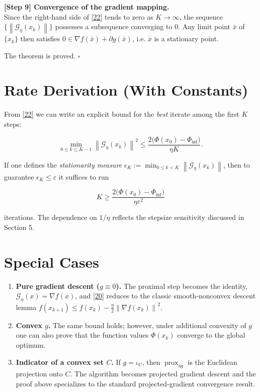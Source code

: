 \documentclass{article}
\newcommand{\prox}{\operatorname{prox}}
\newcommand{\grad}{\nabla}
\newcommand{\norm}[1]{\left\|#1\right\|}
\begin{document}
\noindent\textbf{[Step 9] Convergence of the gradient mapping.}\\
Since the right‑hand side of \eqref{22} tends to zero as $K\to\infty$, the sequence $\{\norm{\mathcal{G}_{\eta}(x_k)}\}$ possesses a subsequence converging to $0$. Any limit point $\bar x$ of $\{x_k\}$ then satisfies $0\in\grad f(\bar x)+\partial g(\bar x)$, i.e. $\bar x$ is a stationary point.

The theorem is proved. $\square$

\section*{Rate Derivation (With Constants)}
From \eqref{22} we can write an explicit bound for the \emph{best} iterate among the first $K$ steps:

\[
\min_{0\le k\le K-1}\norm{\mathcal{G}_{\eta}(x_k)}^{2}
\le \frac{2\bigl(\Phi(x_{0})-\Phi_{\inf}\bigr)}{\eta K}.
\]

If one defines the \emph{stationarity measure} $\epsilon_K:=\min_{0\le k<K}\norm{\mathcal{G}_{\eta}(x_k)}$, then to guarantee $\epsilon_K\le\varepsilon$ it suffices to run  

\[
K\ge \frac{2\bigl(\Phi(x_{0})-\Phi_{\inf}\bigr)}{\eta\varepsilon^{2}}
\]

iterations. The dependence on $1/\eta$ reflects the stepsize sensitivity discussed in Section 5.

\section*{Special Cases}
\begin{enumerate}[label=\alph*)]
\item \textbf{Pure gradient descent ($g\equiv0$).} The proximal step becomes the identity, $\mathcal{G}_{\eta}(x)=\grad f(x)$, and \eqref{20} reduces to the classic smooth‑nonconvex descent lemma $f(x_{k+1})\le f(x_k)-\frac{\eta}{2}\norm{\grad f(x_k)}^{2}$.
\item \textbf{Convex $g$.} The same bound holds; however, under additional convexity of $g$ one can also prove that the function values $\Phi(x_k)$ converge to the global optimum.
\item \textbf{Indicator of a convex set $C$.} If $g=\iota_{C}$, then $\prox_{\eta g}$ is the Euclidean projection onto $C$. The algorithm becomes projected gradient descent and the proof above specializes to the standard projected‑gradient convergence result.
\end{enumerate}
\end{document}
